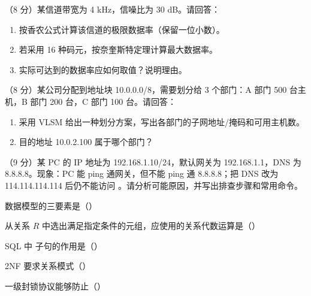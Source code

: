 \documentclass[a4paper,11pt]{article}
\begin{document}
\q （8 分）某信道带宽为 4 kHz，信噪比为 30 dB。请回答：
\begin{enumerate}[label=（\arabic*）, leftmargin=2.4em, itemsep=1pt]
  \item 按香农公式计算该信道的极限数据率（保留一位小数）。
  \item 若采用 16 种码元，按奈奎斯特定理计算最大数据率。
  \item 实际可达到的数据率应如何取值？说明理由。
\end{enumerate}
\anslines{6.5cm}

\q （8 分）某公司分配到地址块 10.0.0.0/8，需要划分给 3 个部门：A 部门 500 台主机，B 部门 200 台，C 部门 100 台。请回答：
\begin{enumerate}[label=（\arabic*）, leftmargin=2.4em, itemsep=1pt]
  \item 采用 VLSM 给出一种划分方案，写出各部门的子网地址/掩码和可用主机数。
  \item 目的地址 10.0.2.100 属于哪个部门？
\end{enumerate}
\anslines{7cm}

\q （9 分）某 PC 的 IP 地址为 192.168.1.10/24，默认网关为 192.168.1.1，DNS 为 8.8.8.8。现象：PC 能 ping 通网关，但不能 ping 通 8.8.8.8；把 DNS 改为 114.114.114.114 后仍不能访问 。请分析可能原因，并写出排查步骤和常用命令。
\anslines{8cm}



\q 数据模型的三要素是（\quad）

\q 从关系 $R$ 中选出满足指定条件的元组，应使用的关系代数运算是（\quad）

\q SQL 中  子句的作用是（\quad）

\q 2NF 要求关系模式（\quad）

\q 一级封锁协议能够防止（\quad）
\end{document}
